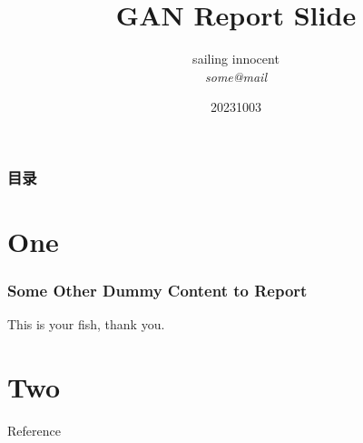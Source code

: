 \documentclass{njupre/njupre}
\title[GAN REPORT SLIDE]{ GAN Report Slide}
\author[SI]{\texorpdfstring{sailing innocent \\ \smallskip \textit{some@mail}}{}}
\date[\today]{\texorpdfstring{20231003}{}}
\begin{document}
\begin{frame}
    \titlepage
\end{frame}
\begin{frame}
    \frametitle{目录}
    \tableofcontents
\end{frame}
\section{One}
\begin{frame}
    \frametitle{Some Other Dummy Content to Report}
    This is your fish, thank you.
\end{frame}
\section{Two}


\begin{frame}[allowframebreaks]{Reference}
    
    
\end{frame}
\end{document}
